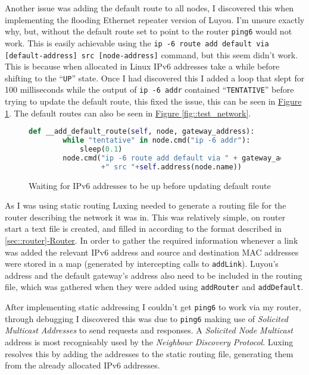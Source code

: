 \documentclass[12pt,a4paper,twoside,openany]{report}
\begin{document}
\bigskip

Another issue was adding the default route to all nodes, I discovered this when implementing the flooding Ethernet repeater version of Luyou.  I'm unsure exactly why, but, without the default route set to point to the router \verb!ping6! would not work. This is easily achievable using the \verb!ip -6 route add default via [default-address] src [node-address]! command, but this seem didn't work.  This is because when allocated in Linux IPv6 addresses take a while before shifting to the ``\verb!UP!'' state.  Once I had discovered this I added a loop that slept for 100 milliseconds while the output of \verb!ip -6 addr! contained ``\verb!TENTATIVE!'' before trying to update the default route, this fixed the issue, this can be seen in \hyperref[fig::tentative]{Figure }\ref{fig::tentative}.  The default routes can also be seen in \hyperref[fig::test_network]{Figure }\ref{fig::test_network}.


\begin{figure}
\begin{lstlisting}[language=Python]
def __add_default_route(self, node, gateway_address):
        while "tentative" in node.cmd("ip -6 addr"):
            sleep(0.1)
        node.cmd("ip -6 route add default via " + gateway_address 
                 +" src "+self.address(node.name))
\end{lstlisting}
\caption{Waiting for IPv6 addresses to be up before updating default route}
\label{fig::tentative}
\end{figure}

\bigskip

As I was using static routing Luxing needed to generate a routing file for the router describing the network it was in.  This was relatively simple, on router start a text file is created, and filled in according to the format described in \ref{sec::router}\hyperref[sec::router]{-Router}.  In order to gather the required information whenever a link was added the relevant IPv6 address and source and destination MAC addresses were stored in a map (generated by intercepting calls to \verb!addLink!).  Luyou's address and the default gateway's address also need to be included in the routing file, which was gathered when they were added using \verb!addRouter! and \verb!addDefault!.

\bigskip

After implementing static addressing I couldn't get \verb!ping6! to work via my router, through debugging I discovered this was due to \verb!ping6! making use of \textit{Solicited Multicast Addresses} to send requests and responses. A \textit{Solicited Node Multicast} address is most recognisably used by the \textit{Neighbour Discovery Protocol}\cite{ndp_rfc}. Luxing resolves this by adding the addresses to the static routing file, generating them from the already allocated IPv6 addresses.
\end{document}
